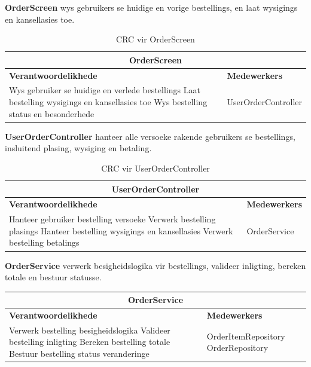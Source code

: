 \vspace{1em}
\textbf{OrderScreen} wys gebruikers se huidige en vorige bestellings, en laat wysigings en kansellasies toe.
\begin{table}[H]\centering\begin{tabular}{|p{}|p{}|}
    \hline
    \multicolumn{2}{|c|}{\textbf{OrderScreen}} \\
    \hline
    \textbf{Verantwoordelikhede} & \textbf{Medewerkers} \\
    \hline
    Wys gebruiker se huidige en verlede bestellings \newline
    Laat bestelling wysigings en kansellasies toe \newline
    Wys bestelling status en besonderhede
    &
    UserOrderController \\
    \hline
\end{tabular}
\caption{CRC vir OrderScreen}
\label{tab:crc_order_screen}
\end{table}

\vspace{1em}
\textbf{UserOrderController} hanteer alle versoeke rakende gebruikers se bestellings, insluitend plasing, wysiging en betaling.
\begin{table}[H]\centering\begin{tabular}{|p{}|p{}|}
    \hline
    \multicolumn{2}{|c|}{\textbf{UserOrderController}} \\
    \hline
    \textbf{Verantwoordelikhede} & \textbf{Medewerkers} \\
    \hline
    Hanteer gebruiker bestelling versoeke \newline
    Verwerk bestelling plasings \newline
    Hanteer bestelling wysigings en kansellasies \newline
    Verwerk bestelling betalings
    &
    OrderService \\
    \hline
\end{tabular}
\caption{CRC vir UserOrderController}
\label{tab:crc_user_order_controller}
\end{table}

\vspace{1em}
\textbf{OrderService} verwerk besigheidslogika vir bestellings, valideer inligting, bereken totale en bestuur statusse.
\begin{table}[H]\centering\begin{tabular}{|p{}|p{}|}
    \hline
    \multicolumn{2}{|c|}{\textbf{OrderService}} \\
    \hline
    \textbf{Verantwoordelikhede} & \textbf{Medewerkers} \\
    \hline
    Verwerk bestelling besigheidslogika \newline
    Valideer bestelling inligting \newline
    Bereken bestelling totale \newline
    Bestuur bestelling status veranderinge
    &
    OrderItemRepository \newline
    OrderRepository \\
    \hline
\end{tabular}\end{table}

